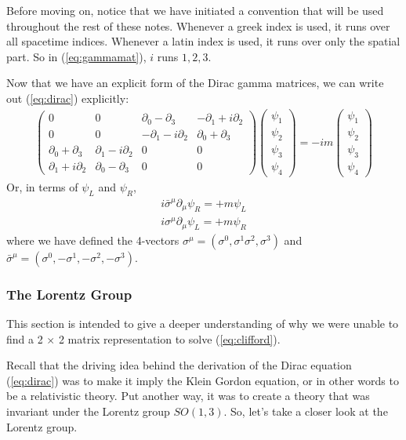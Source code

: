 \documentclass[12pt,epsf]{article}
\def\nolabel{\nonumber }
\def\nolabel{\nonumber }
\begin{document}
Before moving on, notice that we have initiated a convention that will
be used throughout the rest of these notes.  Whenever a greek index is
used, it runs over all spacetime indices.  Whenever a latin index is
used, it runs over only the spatial part.  So in (\ref{eq:gammamat}),
$i$ runs $1,2,3$.  

Now that we have an explicit form of the Dirac gamma matrices, we can
write out (\ref{eq:dirac}) explicitly:
\begin{eqnarray}
\begin{pmatrix}
0 & 0 & \partial_0 - \partial_3 & -\partial_1+i\partial_2 \\
0 & 0 & -\partial_1 - i\partial_2 & \partial_0 + \partial_3 \\
\partial_0 + \partial_3 & \partial_1 - i\partial_2 & 0 & 0 \\
\partial_1 + i\partial_2 & \partial_0 - \partial_3 & 0 & 0 
\end{pmatrix}
\begin{pmatrix}
\psi_1 \\ \psi_2 \\ \psi_3 \\ \psi_4
\end{pmatrix} = -im
\begin{pmatrix}
\psi_1 \\ \psi_2 \\ \psi_3 \\ \psi_4
\end{pmatrix}\nolabel
\end{eqnarray}
Or, in terms of $\psi_L$ and $\psi_R$, 
\begin{eqnarray}
i \bar \sigma^{\mu}\partial_{\mu} \psi_R= + m\psi_L \nolabel\\
i \sigma^{\mu}\partial_{\mu}\psi_L = + m\psi_R\nolabel
\end{eqnarray}
where we have defined the 4-vectors $\sigma^{\mu} =
(\sigma^0,\sigma^1\sigma^2,\sigma^3)$ and $\bar \sigma^{\mu} =
(\sigma^0, -\sigma^1, -\sigma^2,-\sigma^3)$.

\subsubsection{The Lorentz Group}

This section is intended to give a deeper understanding of why we were
unable to find a 2 $\times$ 2 matrix representation to solve
(\ref{eq:clifford}).  

Recall that the driving idea behind the derivation of the Dirac
equation (\ref{eq:dirac}) was to make it imply the Klein Gordon
equation, or in other words to be a relativistic theory.  Put another
way, it was to create a theory that was invariant under the Lorentz
group $SO(1,3)$.  So, let's take a closer look at the Lorentz group.  
\end{document}
